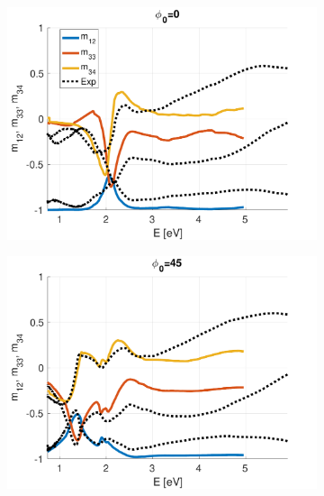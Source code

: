 \begin{figure}[h!]
   \begin{subfigure}{0.32\linewidth}
        \centering
        \includegraphics[width=\linewidth, trim= 0cm 0cm 2cm 0cm, clip]{figures/ch4/S5B/NCS/S5B_NCS_phi0.pdf}
   \end{subfigure}
   \begin{subfigure}{0.32\linewidth}
        \centering
        \includegraphics[width=\linewidth, trim= 0cm 0cm 2cm 0cm, clip]{figures/ch4/S5B/NCS/S5B_NCS_phi45.pdf}
   \end{subfigure}
   \begin{subfigure}{0.32\linewidth}
        \centering

\end{subfigure}
\end{figure}

